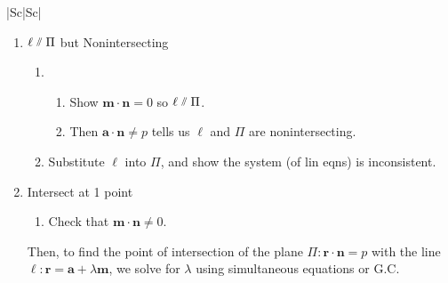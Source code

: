 \documentclass[oneside]{book}
\begin{document}
\begin{longtable}{|Sc|Sc|}
{\begin{minipage}{\textwidth}
\begin{enumerate}
\begin{enumerate}[label=M\arabic*:]
\begin{enumerate}
        \item Then \(\mathbf{a}\cdot \mathbf{n}=p\) tells us \(\ell\) lies in \(\Pi\).
      \end{enumerate}
      \item Substitute \(\ell\) into \(\Pi\) and show the system (of lin eqns) is consistent for all \(\lambda\).
    \end{enumerate}
    \item \(\ell \newparallel \Pi\) but Nonintersecting
    \begin{enumerate}[label=M\arabic*:]
      \item 
      \begin{enumerate}
        \item Show \(\mathbf{m}\cdot \mathbf{n}=0\) so \(\ell \newparallel \Pi\).
        \item Then \(\mathbf{a}\cdot \mathbf{n} \neq p\) tells us \(\ell\) and \(\Pi\) are nonintersecting.
      \end{enumerate}
      \item Substitute \(\ell\) into \(\Pi\), and show the system (of lin eqns) is inconsistent.
    \end{enumerate} 
    \item Intersect at 1 point
    \begin{enumerate}[label=M\arabic*:]
      \item Check that \(\mathbf{m}\cdot \mathbf{n} \neq 0\).
    \end{enumerate}
    Then, to find the point of intersection of the plane \(\Pi\colon \mathbf{r}\cdot \mathbf{n}=p\) with the line \(\ell\colon \mathbf{r}=\mathbf{a}+\lambda \mathbf{m}\),
    we solve for \(\lambda\) using simultaneous equations or G.C.
  \end{enumerate}
\end{minipage}}\\
\hline
{}\\
\hline
{}
\end{longtable}
\end{document}

